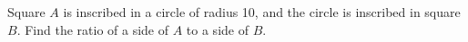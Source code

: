 Square $A$ is inscribed in a circle of radius 10, and the circle is inscribed in square $B$. Find the ratio of a side of $A$ to a side of $B$.
